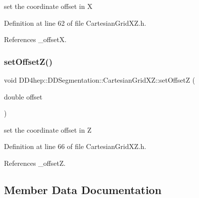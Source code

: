 set the coordinate offset in X 



Definition at line 62 of file Cartesian\+Grid\+X\+Z.\+h.



References \+\_\+offsetX.

\hypertarget{class_d_d4hep_1_1_d_d_segmentation_1_1_cartesian_grid_x_z_a45d273f0fcb485427d30c465477f4c61}{}\label{class_d_d4hep_1_1_d_d_segmentation_1_1_cartesian_grid_x_z_a45d273f0fcb485427d30c465477f4c61} 
\subsubsection{\texorpdfstring{set\+Offset\+Z()}{setOffsetZ()}}
{\footnotesize\ttfamily void D\+D4hep\+::\+D\+D\+Segmentation\+::\+Cartesian\+Grid\+X\+Z\+::set\+OffsetZ (\begin{DoxyParamCaption}\item[{double}]{offset }\end{DoxyParamCaption})\hspace{0.3cm}{\ttfamily [inline]}}



set the coordinate offset in Z 



Definition at line 66 of file Cartesian\+Grid\+X\+Z.\+h.



References \+\_\+offsetZ.



\subsection{Member Data Documentation}
\hypertarget{class_d_d4hep_1_1_d_d_segmentation_1_1_cartesian_grid_x_z_a1ecb47b3c00cafed8fae40bb9bca2180}{}\label{class_d_d4hep_1_1_d_d_segmentation_1_1_cartesian_grid_x_z_a1ecb47b3c00cafed8fae40bb9bca2180} 
